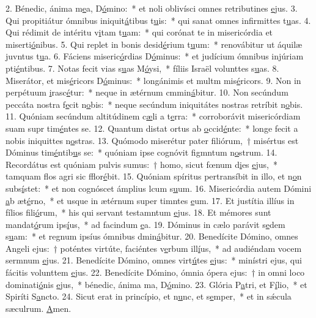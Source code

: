 2. Bénedic, ánima m\uline{e}a, D\uline{ó}mino:~* et noli oblivísci omnes retributines \uline{e}jus.
3. Qui propitiátur ómnibus iniquit\uline{á}tibus t\uline{u}is:~* qui sanat omnes infirmittes t\uline{u}as.
4. Qui rédimit de intéritu v\uline{i}tam t\uline{u}am:~* qui corónat te in misericórdia et miserti\uline{ó}nibus.
5. Qui replet in bonis desid\uline{é}rium t\uline{u}um:~* renovábitur ut áquilæ juvntus t\uline{u}a.
6. Fáciens miseric\uline{ó}rdias D\uline{ó}minus:~* et judícium ómnibus injúriam pti\uline{é}ntibus.
7. Notas fecit vias s\uline{u}as M\uline{ó}ysi,~* fíliis Israël volunttes s\uline{u}as.
8. Miserátor, et mis\uline{é}ricors D\uline{ó}minus:~* longánimis et multm mis\uline{é}ricors.
9. Non in perpétuum \uline{i}rasc\uline{é}tur:~* neque in ætérnum cmmin\uline{á}bitur.
10. Non secúndum peccáta nostra f\uline{e}cit n\uline{o}bis:~* neque secúndum iniquitátes nostras retríbit n\uline{o}bis.
11. Quóniam secúndum altitúdinem c\uline{æ}li a t\uline{e}rra:~* corroborávit misericórdiam suam supr tim\uline{é}ntes se.
12. Quantum distat ortus ab \uline{o}ccid\uline{é}nte:~* longe fecit a nobis iniquittes n\uline{o}stras.
13. Quómodo miserétur pater filiórum,~† misértus est Dóminus tim\uline{é}ntib\uline{u}s se:~* quóniam ipse cognóvit figmntum n\uline{o}strum.
14. Recordátus est quóniam pulvis sumus:~† homo, sicut fœnum d\uline{i}es \uline{e}jus,~* tamquam flos agri sic fflor\uline{é}bit.
15. Quóniam spíritus pertransíbit in illo, et n\uline{o}n subs\uline{í}stet:~* et non cognóscet ámplius lcum s\uline{u}um.
16. Misericórdia autem Dómini \uline{a}b æt\uline{é}rno,~* et usque in ætérnum super timntes \uline{e}um.
17. Et justítia illíus in fílios f\uline{i}li\uline{ó}rum,~* his qui servant testamntum \uline{e}jus.
18. Et mémores sunt mandat\uline{ó}rum ips\uline{í}us,~* ad facindum \uline{e}a.
19. Dóminus in cælo parávit s\uline{e}dem s\uline{u}am:~* et regnum ipsíus ómnibus dmin\uline{á}bitur.
20. Benedícite Dómino, omnes Angeli ejus:~† poténtes virtúte, faciéntes v\uline{e}rbum ill\uline{í}us,~* ad audiéndam vocem sermnum \uline{e}jus.
21. Benedícite Dómino, omnes virt\uline{ú}tes \uline{e}jus:~* minístri ejus, qui fácitis volunttem \uline{e}jus.
22. Benedícite Dómino, ómnia ópera ejus:~† in omni loco dominati\uline{ó}nis \uline{e}jus,~* bénedic, ánima ma, D\uline{ó}mino.
23. Glória P\uline{a}tri, et F\uline{í}lio,~* et Spiríti S\uline{a}ncto.
24. Sicut erat in princípio, et n\uline{u}nc, et s\uline{e}mper,~* et in sǽcula sæculrum. \uline{A}men.
